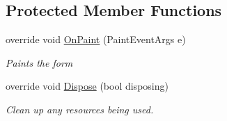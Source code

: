 \subsection*{Protected Member Functions}
\begin{DoxyCompactItemize}
\item 
override void \hyperlink{class_n_n_gen_1_1_visualizer_layer_ab129e028f30623f2377b82d2e3f1c7ed}{On\+Paint} (Paint\+Event\+Args e)
\begin{DoxyCompactList}\small\item\em Paints the form \end{DoxyCompactList}\item 
override void \hyperlink{class_n_n_gen_1_1_visualizer_layer_a94a79048a1188b72705c77503a801008}{Dispose} (bool disposing)
\begin{DoxyCompactList}\small\item\em Clean up any resources being used. \end{DoxyCompactList}\end{DoxyCompactItemize}
